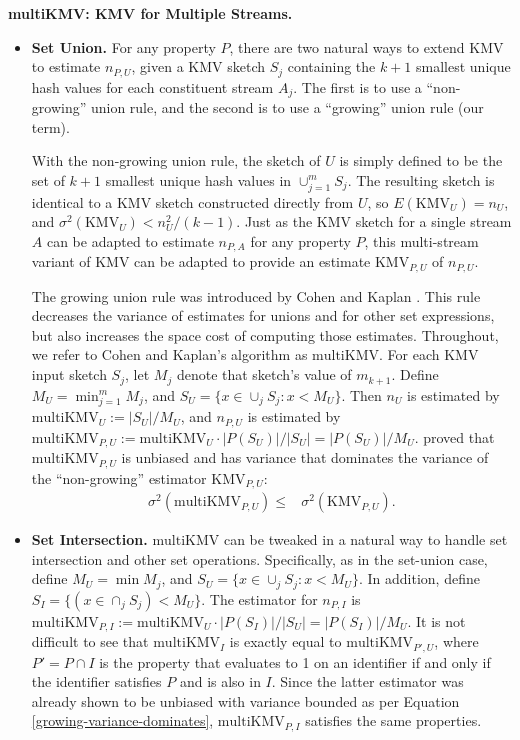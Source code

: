 \documentclass{article}
\newcommand{\romKMV}{\mathrm{KMV}}
\newcommand{\IKMV}{multiKMV}
\newcommand{\rommultiKMV}{\textrm{multiKMV}}
\begin{document}
\medskip \noindent \textbf{\IKMV: KMV for Multiple Streams.}\label{subsubBKMV2} \label{sec:IKMV}
 \begin{itemize}
 \item \textbf{Set Union.} 
For any property $P$, there are two natural ways to extend KMV to estimate $n_{P, U}$, 
given a KMV sketch $S_j$ containing the $k+1$ smallest unique hash values for each constituent stream $A_j$. 
The first is to use a ``non-growing'' union rule, and the second is to use a ``growing'' union rule (our term). 

With the non-growing union rule, the sketch 
of $U$ is simply defined to be the set of $k+1$ smallest unique hash values in $\cup_{j=1}^m S_j$.
The resulting sketch is identical to a KMV sketch constructed directly from $U$, so $E(\romKMV_U) = n_U$, and
$\sigma^2(\romKMV_U) < n_U^2/(k-1)$. 
Just as the KMV sketch for a single stream $A$ can be adapted to estimate $n_{P, A}$ for any property $P$, 
this multi-stream variant of KMV can be adapted to provide an estimate $\romKMV_{P,U}$ of
$n_{P, U}$.

The growing union rule
was introduced by Cohen and Kaplan \cite{cohen2009leveraging}.
This rule decreases the variance of estimates
for unions and for other set expressions, but also increases the space
cost of computing those estimates. Throughout, we refer to Cohen and Kaplan's algorithm as $\rommultiKMV$.
\label{subsubIKMV}
For each KMV input sketch $S_j$, let $M_j$ denote that sketch's value of $m_{k+1}$. 
Define $M_U = \min_{j=1}^m M_j$, and $S_U = \{x \in \cup_j S_j \colon x < M_U\}$.
Then $n_U$ is estimated by $\rommultiKMV_U := |S_U|/M_U$, 
and  $n_{P, U}$ is estimated by $\rommultiKMV_{P, U} := \rommultiKMV_U \cdot |P(S_U)| /|S_U| = |P(S_U)| / M_U$.
\cite{cohen2009leveraging} proved that $\rommultiKMV_{P, U}$ is unbiased and has
variance that 
dominates the variance of the ``non-growing'' estimator $\romKMV_{P,U}$:
\begin{align}
\sigma^2(\rommultiKMV_{P, U}) \le & \sigma^2(\romKMV_{P, U}). \end{align}


\item \textbf{Set Intersection.} $\rommultiKMV$ can be tweaked in a natural way to handle set intersection and other set operations.
Specifically, as in the set-union case, define $M_U = \min M_j$, and $S_U = \{x \in \cup_j S_j \colon x < M_U\}$. In addition, define $S_I =  \{(x \in \cap_j S_j) < M_U\}$.
The estimator for $n_{P, I}$ is $\rommultiKMV_{P, I} := \rommultiKMV_U \cdot |P(S_I)| /|S_U| = |P(S_I)| / M_U$.
It is not difficult to see that $\rommultiKMV_I$ is exactly equal to $\rommultiKMV_{P', U}$, 
where $P'= P \cap I$ is the property that evaluates to 1 on an identifier if and only if
the identifier satisfies $P$ and is also in $I$. 
Since the latter estimator was already shown to be unbiased with variance bounded as per Equation \eqref{growing-variance-dominates},
$\rommultiKMV_{P, I}$ satisfies the same properties. 
\end{itemize}
\end{document}
